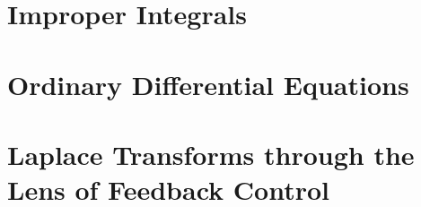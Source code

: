 \documentclass[letterpaper]{book}
\begin{document}
\chapter{Improper Integrals}
\label{chap:ImproperIntegrals}


\chapter{Ordinary Differential Equations}
\label{chap:ODEs}


\chapter{Laplace Transforms through the Lens of Feedback Control}
\label{chap:LaplaceTransformFeedbackControl}

\end{document}
